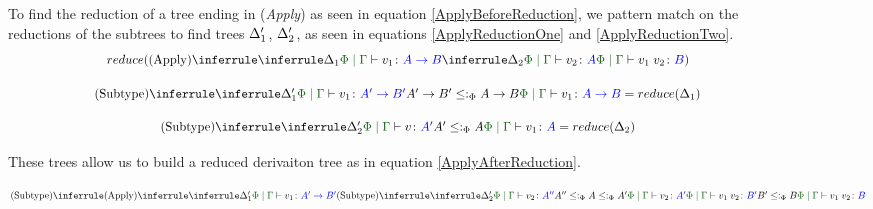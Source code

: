 \documentclass{Report}
\begin{document}
\begin{figure}
    \begin{framed}
    To find the reduction of a tree ending in (\textit{Apply}) as seen in equation \ref{ApplyBeforeReduction}, we pattern match on the reductions of the subtrees to find trees $\Delta_1'$, $\Delta_2'$, as seen in equations \ref{ApplyReductionOne} and \ref{ApplyReductionTwo}.
    \begin{equation}\label{ApplyBeforeReduction}
        \scalebox{.9}{$
        \reduce(\ntreeruleII{Apply}{
            \treeruleI{\D_1}{
                \gpetyperelation{v_1}{\ab}
            }
        }{
            \treeruleI{\D_2}{
                \gpetyperelation{v_2}{A}
            }
        }{
            \gpetyperelation{\apply{v_1}{v_2}}{B}
        })
        $}
    \end{equation}

    \begin{equation}\label{ApplyReductionOne}
        \scalebox{.9}{$
            \ntreeruleII{Subtype}{
                \treeruleI{\D'_1}{\gpetyperelation{v_1}{\fntype{A'}{B'}}}
            }{
                \fntype{A'}{B'}\subtypep\fntype{A}{B}
            }{
                \gpetyperelation{v_1}{\ab}
            }  = \reduce(\D_1)
            $}
    \end{equation}

    \begin{equation}\label{ApplyReductionTwo}
        \scalebox{.9}{$
        \ntreeruleII{Subtype}{
            \treeruleI{\D'_2}{\gpetyperelation{v}{A'}}
        }{
            A'\subtypep A
        }{
            \gpetyperelation{v_1}{A}
        } = \reduce(\D_2)
        $}
    \end{equation}

    These trees allow us to build a reduced derivaiton tree as in equation \ref{ApplyAfterReduction}.

    \begin{equation}\label{ApplyAfterReduction}
        \scalebox{.8}{$
        \ntreeruleII{Subtype}{
            \ntreeruleII{Apply}{
                \treeruleI{
                    \D'_1
                }{
                    \gpetyperelation{v_1}{\fntype{A'}{B'}}
                }
            }{
                \ntreeruleII{Subtype}{
                    \treeruleI{\D'_2}{\gpetyperelation{v_2}{A''}}
                }{
                    A'' \subtypep A \subtypep A'
                } {
                    \gpetyperelation{v_2}{A'}
                }
            }{
                \gpetyperelation{\apply{v_1}{v_2}}{B'}
            }
        }{
            B' \subtypep B
        }{
            \gpetyperelation{\apply{v_1}{v_2}}{B}
        }
        $}
    \end{equation}



\end{framed}
\end{figure}
\end{document}
